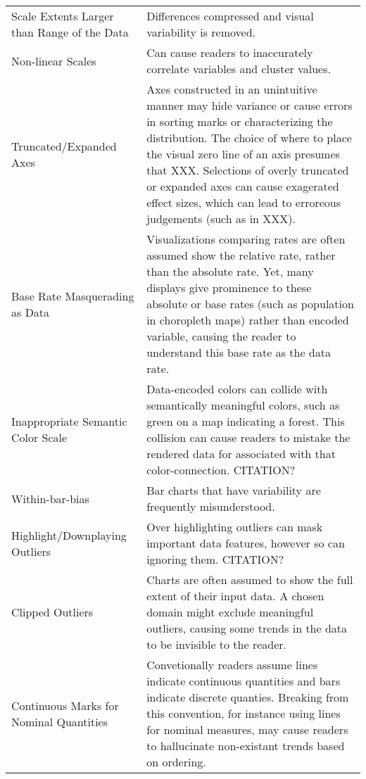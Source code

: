 \begin{table*}[]
\begin{tabular}{p{5cm}p{12cm}}
 \rowcolor{colorc-opaque}Scale Extents Larger than Range of the Data & Differences compressed and visual variability is removed. \cite{cleveland1982variables}\\
 \rowcolor{colorc}Non-linear Scales & Can cause readers to inaccurately correlate variables and cluster values. \cite{pandey2015deceptive}\\
 \rowcolor{colorc-opaque}Truncated/Expanded Axes & Axes constructed in an unintuitive manner may hide variance or cause errors in sorting marks or characterizing the distribution.  The choice of where to place the visual zero line of an axis presumes that XXX. Selections of overly truncated or expanded axes can cause exagerated effect sizes, which can lead to erroreous judgements (such as in XXX).  \cite{pandey2015deceptive, correll2017black, cleveland1982variables, ritchie2019lie, correll2019truncating}\\
 \rowcolor{colorc}Base Rate Masquerading as Data  & Visualizations comparing rates are often assumed show the relative rate, rather than the absolute rate. Yet, many displays give prominence to these absolute or base rates (such as population in choropleth maps) rather than encoded variable, causing the reader to understand this base rate as the data rate.  \cite{correll2016surprise}\\
 \rowcolor{colorc-opaque}Inappropriate Semantic Color Scale  & Data-encoded colors can collide with semantically meaningful colors, such as green on a map indicating a forest. This collision can cause readers to mistake the rendered data for associated with that color-connection. CITATION?\\
 \rowcolor{colorc}Within-bar-bias & Bar charts that have variability are frequently misunderstood. \cite{newman2012bar}\\
 \rowcolor{colorc-opaque}Highlight/Downplaying Outliers & Over highlighting outliers can mask important data features, however so can ignoring them. CITATION?\\
 \rowcolor{colorc}Clipped Outliers  & Charts are often assumed to show the full extent of their input data. A chosen domain might exclude meaningful outliers, causing some trends in the data to be invisible to the reader. \\
 \rowcolor{colorc-opaque}Continuous Marks for Nominal Quantities  & Convetionally readers assume lines indicate continuous quantities and bars indicate discrete quanties. Breaking from this convention, for instance using lines for nominal measures, may cause readers to hallucinate non-existant trends based on ordering.  \cite{mcnuttlinting, zacks1999bars}\\

\end{tabular}
\end{table*}
